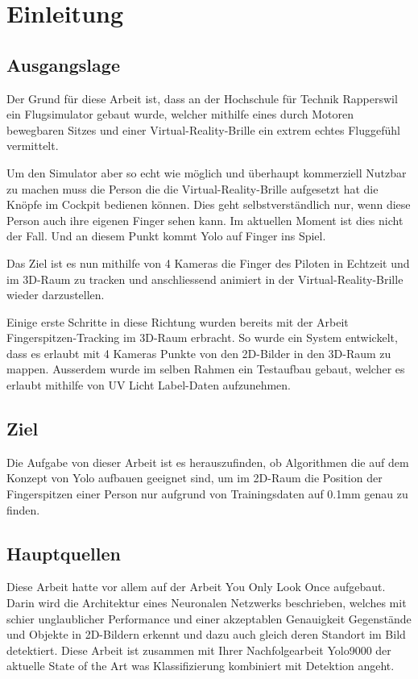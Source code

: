 \newpage
\section{Einleitung}
\subsection{Ausgangslage}
Der Grund für diese Arbeit ist, dass an der Hochschule für Technik Rapperswil ein Flugsimulator gebaut wurde, welcher  mithilfe eines durch Motoren bewegbaren Sitzes und einer Virtual-Reality-Brille ein extrem echtes Fluggefühl vermittelt.

Um den Simulator aber so echt wie möglich und überhaupt kommerziell Nutzbar zu machen muss die Person die die Virtual-Reality-Brille aufgesetzt hat die Knöpfe im Cockpit bedienen können. 
Dies geht selbstverständlich nur, wenn diese Person auch ihre eigenen Finger sehen kann.
Im aktuellen Moment ist dies nicht der Fall.
Und an diesem Punkt kommt \grqq{}Yolo auf Finger\grqq{} ins Spiel.

Das Ziel ist es nun mithilfe von 4 Kameras die Finger des Piloten in Echtzeit und im 3D-Raum zu tracken und anschliessend animiert in der Virtual-Reality-Brille wieder darzustellen.

Einige erste Schritte in diese Richtung wurden bereits mit der Arbeit \grqq{}Fingerspitzen-Tracking im 3D-Raum\grqq{} \cite{TabeasFingertracking} erbracht.
So wurde ein System entwickelt, dass es erlaubt mit 4 Kameras Punkte von den 2D-Bilder in den 3D-Raum zu mappen.
Ausserdem wurde im selben Rahmen ein Testaufbau gebaut, welcher es erlaubt mithilfe von UV Licht Label-Daten aufzunehmen.

\subsection{Ziel}
Die Aufgabe von dieser Arbeit ist es herauszufinden, ob Algorithmen die auf dem Konzept von Yolo\cite{yolo} aufbauen geeignet sind, um im 2D-Raum die Position der Fingerspitzen einer Person nur aufgrund von Trainingsdaten auf 0.1mm genau zu finden.

\subsection{Hauptquellen}
Diese Arbeit hatte vor allem auf der Arbeit \grqq{}You Only Look Once\grqq{}\cite{yolo} aufgebaut.
Darin wird die Architektur eines Neuronalen Netzwerks beschrieben, welches mit schier unglaublicher Performance und einer akzeptablen Genauigkeit Gegenstände und Objekte in 2D-Bildern erkennt und dazu auch gleich deren Standort im Bild detektiert.
Diese Arbeit ist zusammen mit Ihrer Nachfolgearbeit \grqq{}Yolo9000\grqq{} der aktuelle State of the Art was Klassifizierung kombiniert mit Detektion angeht.

